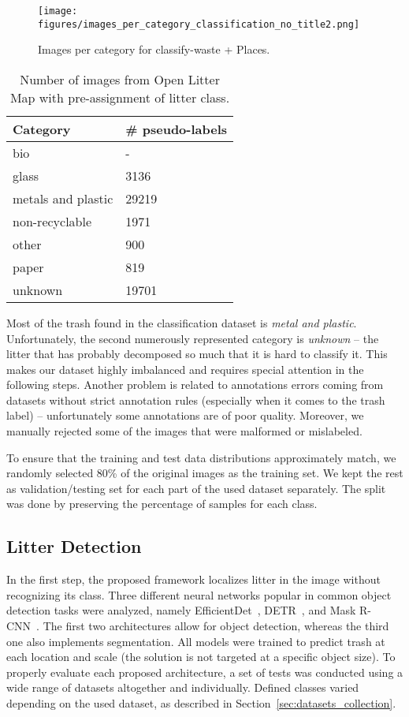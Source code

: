 \documentclass{article}
\begin{document}
\begin{figure}[!hbt]
\centering
  \texttt{[image: figures/images\_per\_category\_classification\_no\_title2.png]}\caption{Images per category for classify-waste + Places.\label{fig.imagesPerCategoryClassification}}
\end{figure}

{
\begin{table}[!hbt]
\centering
\caption{Number of images from Open Litter Map with pre-assignment of litter class.}
\label{tab:pseudolabeling}
\begin{tabular}{ll}
\hline
\textbf{Category}         & \textbf{\# pseudo-labels}  \\ \hline
bio &- \\
glass  &3136   \\
metals and plastic  &29219  \\
non-recyclable &1971   \\
other  &900    \\
paper  &819    \\
unknown    &19701  \\ \hline
\end{tabular}
\end{table}
}

Most of the trash found in the classification dataset is \textit{metal and plastic}. Unfortunately, the second numerously represented category is \textit{unknown} -- the litter that has probably decomposed so much that it is hard to classify it. This makes our dataset highly imbalanced and requires special attention in the following steps. Another problem is related to annotations errors coming from datasets without strict annotation rules (especially when it comes to the trash label) -- unfortunately some annotations are of poor quality. Moreover, we manually rejected some of the images that were malformed or mislabeled.

To ensure that the training and test data distributions approximately match, we randomly selected 80\% of the original images as the training set. We kept the rest as validation/testing set for each part of the used dataset separately. The split was done by preserving the percentage of samples for each class.
 
\subsection{Litter Detection}
\label{sec:litter_detection}
In the first step, the proposed framework localizes litter in the image without recognizing its class. Three different neural networks popular in common object detection tasks were analyzed, namely EfficientDet~\cite{effdet-pytorch}, DETR~\cite{detr}, and Mask R-CNN~\cite{ren2015faster}. The first two architectures allow for object detection, whereas the third one also implements segmentation. All models were trained to predict trash at each location and scale (the solution is not targeted at a specific object size). To properly evaluate each proposed architecture, a set of tests was conducted using a wide range of datasets altogether and individually. Defined classes varied depending on the used dataset, as described in Section~\ref{sec:datasets_collection}.
\end{document}
